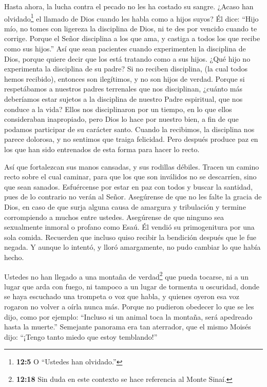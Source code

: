  Hasta ahora, la lucha contra el pecado no les ha costado su
sangre.  ¿Acaso han olvidado\footnote{\textbf{12:5} O
  ``Ustedes han olvidado.''} el llamado de Dios cuando les habla como a
hijos suyos? Él dice: ``Hijo mío, no tomes con ligereza la disciplina de
Dios, ni te des por vencido cuando te corrige.  Porque el
Señor disciplina a los que ama, y castiga a todos los que recibe como
sus hijos.''  Así que sean pacientes cuando experimenten la
disciplina de Dios, porque quiere decir que los está tratando como a sus
hijos. ¿Qué hijo no experimenta la disciplina de su padre? 
Si no reciben disciplina, (la cual todos hemos recibido), entonces son
ilegítimos, y no son hijos de verdad.  Porque si
respetábamos a nuestros padres terrenales que nos disciplinan, ¿cuánto
más deberíamos estar sujetos a la disciplina de nuestro Padre
espiritual, que nos conduce a la vida?  Ellos nos
disciplinaron por un tiempo, en lo que ellos consideraban inapropiado,
pero Dios lo hace por nuestro bien, a fin de que podamos participar de
su carácter santo.  Cuando la recibimos, la disciplina nos
parece dolorosa, y no sentimos que traiga felicidad. Pero después
produce paz en los que han sido entrenados de esta forma para hacer lo
recto.

 Así que fortalezcan sus manos cansadas, y sus rodillas
débiles.  Tracen un camino recto sobre el cual caminar,
para que los que son inválidos no se descarríen, sino que sean sanados.
 Esfuércense por estar en paz con todos y buscar la
santidad, pues de lo contrario no verán al Señor. 
Asegúrense de que no les falte la gracia de Dios, en caso de que surja
alguna causa de amargura y tribulación y termine corrompiendo a muchos
entre ustedes.  Asegúrense de que ninguno sea sexualmente
inmoral o profano como Esaú. Él vendió su primogenitura por una sola
comida.  Recuerden que incluso quiso recibir la bendición
después que le fue negada. Y aunque lo intentó, y lloró amargamente, no
pudo cambiar lo que había hecho.

 Ustedes no han llegado a una montaña de verdad\footnote{\textbf{12:18}
  Sin duda en este contexto se hace referencia al Monte Sinaí.} que
pueda tocarse, ni a un lugar que arda con fuego, ni tampoco a un lugar
de tormenta u oscuridad,  donde se haya escuchado una
trompeta o voz que habla, y quienes oyeron esa voz rogaron no volver a
oírla nunca más.  Porque no pudieron obedecer lo que se les
dijo, como por ejemplo: ``Incluso si un animal toca la montaña, será
apedreado hasta la muerte.''  Semejante panorama era tan
aterrador, que el mismo Moisés dijo: ``¡Tengo tanto miedo que estoy
temblando!''

